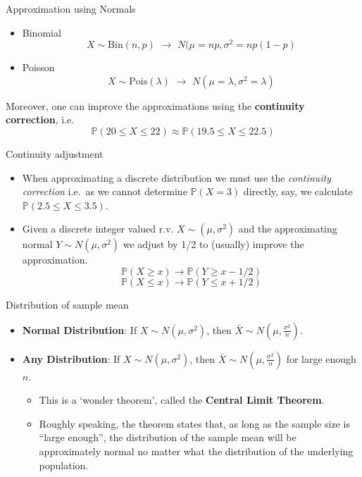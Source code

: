 \documentclass[ignorenonframetext,]{beamer}
\begin{document}
\begin{frame}{Approximation using Normals}

\begin{itemize}
\item
  Binomial
  \[X\sim\text{Bin}(n,p)\,\,\longrightarrow\,\,N(\mu=np,\sigma^2=np(1-p)\]
\item
  Poisson
  \[X\sim\text{Pois}(\lambda)\,\,\longrightarrow\,\,N(\mu=\lambda,\sigma^2=\lambda)\]
\end{itemize}

Moreover, one can improve the approximations using the
\textbf{continuity correction}, i.e.
\[\mathbb{P}(20\le X\le 22)\approx\mathbb{P}(19.5\le X\le 22.5)\]

\end{frame}

\begin{frame}{Continuity adjustment}

\begin{itemize}
\item
  When approximating a discrete distribution we must use the
  \emph{continuity correction} i.e.~as we cannot determine
  \(\mathbb{P}(X=3)\) directly, say, we calculate
  \(\mathbb{P}(2.5\le X\le 3.5)\).
\item
  Given a discrete integer valued r.v. \(X\sim (\mu,\sigma^2)\) and the
  approximating normal \(Y\sim N(\mu,\sigma^2)\) we adjust by 1/2 to
  (usually) improve the approximation.
  \[\mathbb{P}(X\ge x)\to \mathbb{P}(Y\ge x-1/2) \]
  \[\mathbb{P}(X\le x)\to \mathbb{P}(Y\le x+1/2) \]
\end{itemize}

\end{frame}

\begin{frame}{Distribution of sample mean}

\begin{itemize}
\item
  \textbf{Normal Distribution}: If \(X\sim N(\mu,\sigma^2)\), then
  \(\bar{X}\sim N(\mu,\frac{\sigma^2}{n})\).
\item
  \textbf{Any Distribution}: If \(X\sim N(\mu,\sigma^2)\), then
  \(\bar{X}\sim N(\mu,\frac{\sigma^2}{n})\) for large enough \(n\).

  \begin{itemize}
  \item
    This is a `wonder theorem', called the \textbf{Central Limit
    Theorem}.
  \item
    Roughly speaking, the theorem states that, as long as the sample
    size is ``large enough'', the distribution of the sample mean will
    be approximately normal no matter what the distribution of the
    underlying population.
  \end{itemize}
\end{itemize}

\end{frame}
\end{document}
